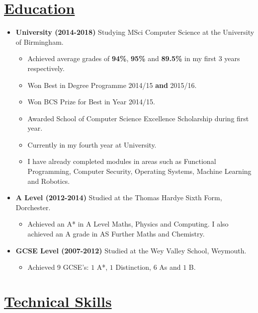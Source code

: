 \documentclass[11pt]{article}
\begin{document}
	\vspace{-30pt}
	\hspace{-100pt}\section*{\underline{Education}}
		\begin {itemize}
			\item \textbf{University (2014-2018)} Studying MSci Computer Science at the University of Birmingham.
				\begin{itemize}
					\item Achieved average grades of \textbf{94\%}, \textbf{95\%} and \textbf{89.5\%} in my first $3$ years respectively.
					\item Won Best in Degree Programme 2014/15 \textbf{and} 2015/16.
					\item Won BCS Prize for Best in Year 2014/15.
					\item Awarded School of Computer Science Excellence Scholarship during first year.
					\item Currently in my fourth year at University.
					\item I have already completed modules in areas such as Functional Programming, Computer Security, Operating Systems, Machine Learning and Robotics.
				\end{itemize}
			\item \textbf{A Level (2012-2014)} Studied at the Thomas Hardye Sixth Form, Dorchester.
				\begin{itemize}
					\item Achieved an A* in A Level Maths, Physics and Computing. I also achieved an A grade in AS Further Maths and Chemistry.
				\end{itemize}
			
			\item \textbf{GCSE Level (2007-2012)}  Studied at the Wey Valley School, Weymouth.
				\begin{itemize}
					\item Achieved 9 GCSE's: $1$ A*, $1$ Distinction, $6$ As and $1$ B.
				\end{itemize} 
		\end{itemize}
	\vspace{-20pt}
	\hspace{-100pt}\section*{\underline{Technical Skills}}
\end{document}
